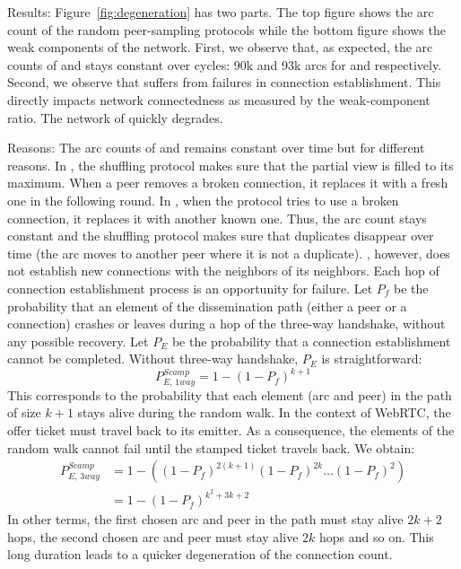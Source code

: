 \begin{asparadesc}
\item[Results:] Figure~\ref{fig:degeneration} has two parts. The top figure
  shows the arc count of the random peer-sampling protocols while the bottom
  figure shows the weak components of the network.  First, we observe that, as
  expected, the arc counts of \CYCLON and \SPRAY stays constant over cycles: 90k
  and 93k arcs for \CYCLON and \SPRAY respectively. Second, we observe that
  \SCAMP suffers from failures in connection establishment. This directly
  impacts network connectedness as measured by the weak-component ratio. The
  network of \SCAMP quickly degrades.
\item[Reasons:] The arc counts of \CYCLON and \SPRAY remains constant
  over time but for different reasons. In \CYCLON, the shuffling
  protocol makes sure that the partial view is filled to its
  maximum. When a peer removes a broken connection, it replaces it
  with a fresh one in the following round.  In \SPRAY, when the
  protocol tries to use a broken connection, it replaces it with
  another known one. Thus, the arc count stays constant and the
  shuffling protocol makes sure that duplicates disappear over time
  (the arc moves to another peer where it is not a duplicate).
  \SCAMP, however, does not establish new connections with the
  neighbors of its neighbors.  Each hop of connection establishment
  process is an opportunity for failure.  Let $P_f$ be the probability
  that an element of the dissemination path (either a peer or a
  connection) crashes or leaves during a hop of the three-way
  handshake, without any possible recovery. Let $P_E$ be the
  probability that a connection establishment cannot be
  completed. Without three-way handshake, $P_E$ is straightforward:
  \begin{equation} P_{E,\,1way}^{Scamp}=1-(1-
    P_f)^{k+1} \end{equation} This corresponds to the probability that
  each element (arc and peer) in the path of size $k+1$ stays alive
  during the random walk. In the context of WebRTC, the offer ticket
  must travel back to its emitter. As a consequence, the elements of
  the random walk cannot fail until the stamped ticket travels
  back. We obtain:
  \begin{align} P_{E,\,3way}^{Scamp} &=1 - ((1-P_f)^{2(k+1)} (1-P_f)^{2k}
                                       \ldots (1-P_f)^2) \nonumber \\
                                     &=1-(1-P_f)^{k^2+3k+2}
  \end{align}
  In other terms, the first chosen arc and peer in the path must stay
  alive $2k+2$ hops, the second chosen arc and peer must stay alive
  $2k$ hops and so on.  This long duration leads to a quicker
  degeneration of the connection count.


\end{asparadesc}
